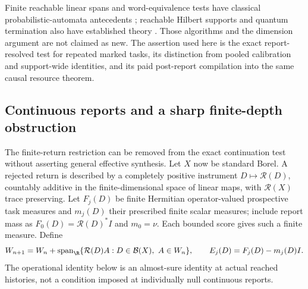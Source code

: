 Finite reachable linear spans and word-equivalence tests have classical probabilistic-automata antecedents \cite{Tzeng92}; reachable Hilbert supports and quantum termination also have established theory \cite{LiYuYing12,Fu24}. Those algorithms and the dimension argument are not claimed as new. The assertion used here is the exact report-resolved test for repeated marked tasks, its distinction from pooled calibration and support-wide identities, and its paid post-report compilation into the same causal resource theorem.

\subsection{Continuous reports and a sharp finite-depth obstruction}
The finite-return restriction can be removed from the exact continuation test without asserting general effective synthesis. Let $X$ now be standard Borel. A rejected return is described by a completely positive instrument $D\mapsto\mathcal R(D)$, countably additive in the finite-dimensional space of linear maps, with $\mathcal R(X)$ trace preserving. Let $F_j(D)$ be finite Hermitian operator-valued prospective task measures and $m_j(D)$ their prescribed finite scalar measures; include report mass as $F_0(D)=\mathcal R(D)^*I$ and $m_0=\nu$. Each bounded score gives such a finite measure. Define
\[
 W_{n+1}=W_n+\operatorname{span}_{\R}\{\mathcal R(D)A:
        D\in\mathcal B(X),\ A\in W_n\},\qquad
 E_j(D)=F_j(D)-m_j(D)I.
\]
The operational identity below is an almost-sure identity at actual reached histories, not a condition imposed at individually null continuous reports.


